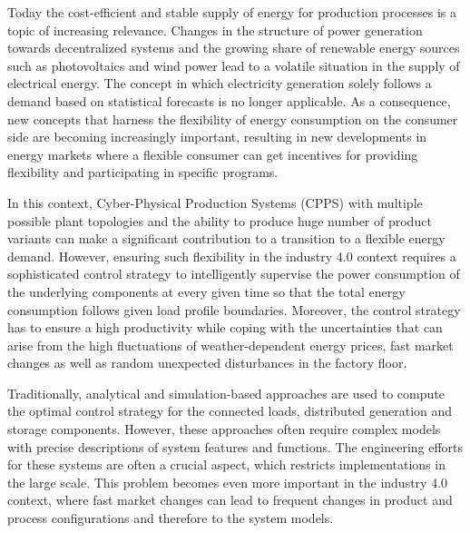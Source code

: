 
Today the cost-efficient and stable supply of energy for production processes is a topic of increasing relevance. Changes in the structure of power generation towards decentralized systems and the growing share of renewable energy sources such as photovoltaics and wind power lead to a volatile situation in the supply of electrical energy. The concept in which electricity generation solely follows a demand based on statistical forecasts is no longer applicable. As a consequence, new concepts that harness the flexibility of energy consumption on the consumer side are becoming increasingly important, resulting in new developments in energy markets where a flexible consumer can get incentives for providing flexibility and participating in specific programs.

In this context, Cyber-Physical Production Systems (CPPS) with multiple possible plant topologies and the ability to produce huge number of product variants can make a significant contribution to a transition to a flexible energy demand. However, ensuring such flexibility in the industry 4.0 context requires a sophisticated control strategy to intelligently supervise the power consumption of the underlying components at every given time so that the total energy consumption follows given load profile boundaries. Moreover, the control strategy has to ensure a high productivity while coping with the uncertainties that can arise from the high fluctuations of weather-dependent energy prices, fast market changes as well as random unexpected disturbances in the factory floor.

Traditionally, analytical and simulation-based approaches are used to compute the optimal control strategy for the connected loads, distributed generation and storage components. However, these approaches often require complex models with precise descriptions of system features and functions. The engineering efforts for these systems are often a crucial aspect, which restricts implementations in the large scale. This problem becomes even more important in the industry 4.0 context, where fast market changes can lead to frequent changes in product and process configurations and therefore to the system models.

